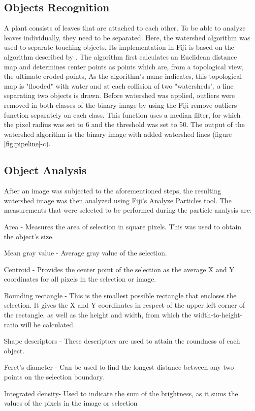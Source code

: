 \documentclass[paper=A4,bibliography=totocnumbered]{scrartcl}
\begin{document}
\subsection{Objects Recognition}
A plant consists of leaves that are attached to each other. To be able to analyze leaves individually, they need to be separated. Here, the watershed algorithm was used to separate touching objects. Its implementation in Fiji is based on the algorithm described by \citet{Kunt.1990}. The algorithm first calculates an Euclidean distance map and determines center points as points which are, from a topological view, the ultimate eroded points, As the algorithm's name indicates, this topological map is "flooded" with water and at each collision of two "watersheds", a line separating two objects is drawn. Before watershed was applied, outliers were removed in both classes of the binary image by using the Fiji remove outliers function separately on each class. This function uses a median filter, for which the pixel radius was set to 6 and the threshold was set to 50. The output of the watershed algorithm is the binary image with added watershed lines (figure \ref{fig:pipeline}-c). 

\subsection{Object Analysis}
After an image was subjected to the aforementioned steps, the resulting watershed image was then analyzed using Fiji's Analyze Particles tool. The measurements that were selected to be performed during the particle analysis are:

\begin{compactitem}
\item Area - Measures the area of selection in square pixels. This was used to obtain the object's size.
\item Mean gray value - Average gray value of the selection.
\item Centroid - Provides the center point of the selection as the average X and Y coordinates for all pixels in the selection or image.
\item Bounding rectangle - This is the smallest possible rectangle that encloses the selection. It gives the X and Y coordinates in respect of the upper left corner of the rectangle, as well as the height and width, from which the width-to-height-ratio will be calculated.
\item Shape descriptors - These descriptors are used to attain the roundness of each object.
\item Feret's diameter - Can be used to find the longest distance between any two points on the selection boundary.
\item Integrated density- Used to indicate the sum of the brightness, as it sums the values of the pixels in the image or selection
\end{compactitem}
\end{document}
